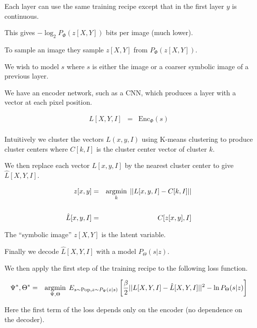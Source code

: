 {\vfill
Each layer can use the same training recipe except that in the first layer $y$ is continuous.

\vfill
This gives  $-\log_2 P_\Phi(z[X,Y])$ bits per image (much lower).

\vfill
To sample an image they sample $z[X,Y]$ from $P_\Phi(z[X,Y])$.



We wish to model $s$ where $s$ is either the image or a coarser symbolic image of a previous layer.

\vfill
We have an encoder network, such as a CNN, which produces a layer with a vector at each pixel position.

\begin{eqnarray*}
L[X,Y,I] & = & \mathrm{Enc}_\Phi(s) \\
\end{eqnarray*}

Intuitively we cluster the vectors $L(x,y,I)$ using K-means clustering to produce cluster centers where $C[k,I]$
is the cluster center vector of cluster $k$.


We then replace each vector $L[x,y,I]$ by the nearest cluster center to give $\hat{L}[X,Y,I]$.

{\huge
\begin{eqnarray*}
z[x,y] & = & \operatorname*{argmin}_k \;||L[x,y,I] - C[k,I]|| \\
\\
\hat{L}[x,y,I] & = & C[z[x,y],I] \\
\end{eqnarray*}
}

The ``symbolic image'' $z[X,Y]$ is the latent variable.


Finally we decode $\hat{L}[X,Y,I]$ with a model $P_\Theta(s|z)$.


We then apply the first step of the training recipe to the following loss function.

{\huge
\begin{eqnarray*}
\Psi^*,\Theta^* & = & \operatorname*{argmin}_{\Psi,\Theta} \;E_{s\sim \mathrm{Pop},z\sim P_\Psi(z|s)}\left[ \frac{\beta}{2}||L[X,Y,I] - \hat{L}[X,Y,I]||^2 -\ln P_\Theta(s|z)\right]
\end{eqnarray*}
}

\vfill
Here the first term of the loss depends only on the encoder (no dependence on the decoder).

}

